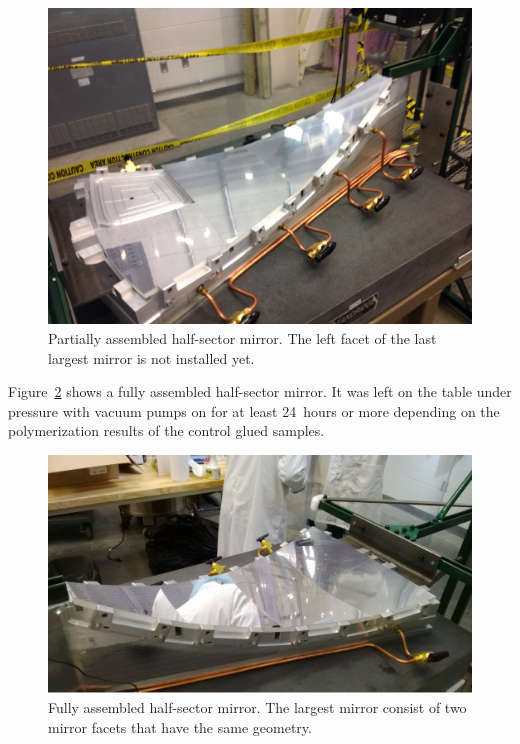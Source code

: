 \begin{figure}[ht]
    \centering
    \includegraphics[width=1.0\linewidth]{images/Partial_Half-sector.png}
    \caption{Partially assembled half-sector mirror. The left facet of the last largest mirror is not installed yet.}
    \label{fig:Partial_Half-sector}
\end{figure} 

Figure~\ref{fig:Half-sector} shows a fully assembled half-sector mirror. It was left on the table under pressure
with vacuum pumps on for at least 24~hours or more depending on the polymerization results of the control glued
samples. 

\begin{figure}[ht]
    \centering
    \includegraphics[width=1.0\linewidth]{images/Half-sector.png}
    \caption{Fully assembled half-sector mirror. The largest mirror consist of two mirror facets that have the same
      geometry.}
    \label{fig:Half-sector}
\end{figure}


